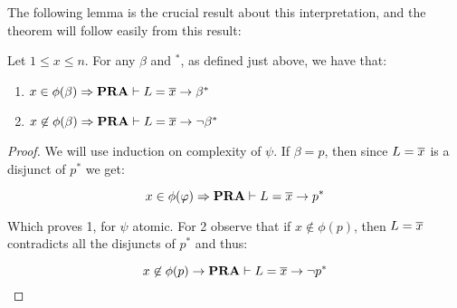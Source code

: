 \documentclass[../main.tex]{subfiles}
\begin{document}
The following lemma is the crucial result about this interpretation, and the
theorem will follow easily from this result:
\begin{lem}
	\label{lem:10}
	Let $1\leq x\leq n$. For any $\beta$ and $^*$, as defined just above, we
	have that:
	\begin{enumerate}
		\item $x\in\phi(\beta)\Rightarrow\text{\textbf{PRA}}\vdash L=\overline x\rightarrow
			\beta^*$
		\item $x\not\in\phi(\beta)\Rightarrow\text{\textbf{PRA}}\vdash L=\overline
			x\rightarrow \neg \beta^*$
	\end{enumerate}
\end{lem}
\begin{proof}
We will use induction on complexity of $\psi$. If $\beta=p$, then since $L=\overline
x$ is a
disjunct of $p^*$ we get:

$$x\in\phi(\varphi)\Rightarrow\text{\textbf{PRA}}\vdash L=\overline x\rightarrow p^*$$

Which proves 1, for $\psi$ atomic. For 2 observe that if $x\not\in\phi( p)$, then
$L=\overline x$ contradicts all the  disjuncts of $p^*$ and thus:

$$x\not\in\phi(p)\rightarrow\text{\textbf{PRA}}\vdash L=\overline x\rightarrow\neg p^*$$


\end{proof}
\end{document}
